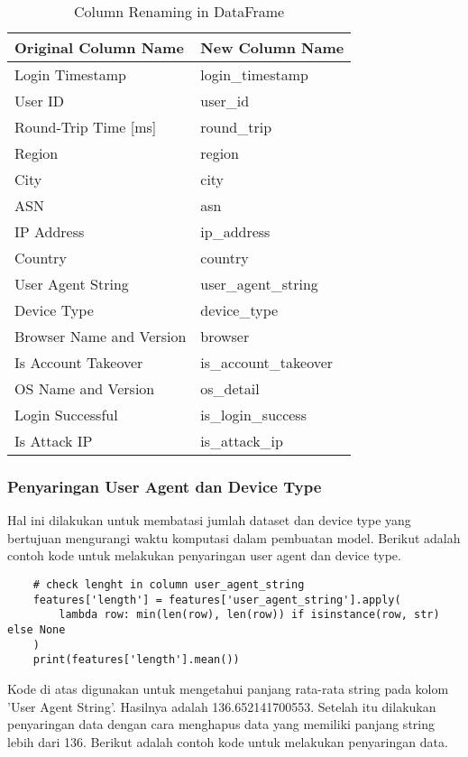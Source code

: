     \begin{table}[H]
        \centering
        \begin{tabular}{|l|l|}
        \hline
        \textbf{Original Column Name} & \textbf{New Column Name} \\ \hline
        Login Timestamp & login\_timestamp \\ 
        User ID & user\_id \\ 
        Round-Trip Time [ms] & round\_trip \\ 
        Region & region \\ 
        City & city \\ 
        ASN & asn \\ 
        IP Address & ip\_address \\ 
        Country & country \\ 
        User Agent String & user\_agent\_string \\ 
        Device Type & device\_type \\ 
        Browser Name and Version & browser \\ 
        Is Account Takeover & is\_account\_takeover \\ 
        OS Name and Version & os\_detail \\ 
        Login Successful & is\_login\_success \\ 
        Is Attack IP & is\_attack\_ip \\ \hline
        \end{tabular}
        \caption{Column Renaming in DataFrame}
        \label{tab:column_renaming}
        \end{table}

\subsubsection{Penyaringan User Agent dan Device Type}
Hal ini dilakukan untuk membatasi jumlah dataset dan device type yang bertujuan mengurangi waktu komputasi dalam pembuatan model. Berikut adalah contoh kode untuk melakukan penyaringan user agent dan device type. 

\begin{lstlisting}
    # check lenght in column user_agent_string
    features['length'] = features['user_agent_string'].apply(
        lambda row: min(len(row), len(row)) if isinstance(row, str) else None
    )
    print(features['length'].mean())
    \end{lstlisting}

    Kode di atas digunakan untuk mengetahui panjang rata-rata string pada kolom 'User Agent String'. Hasilnya adalah 136.652141700553. 
    Setelah itu dilakukan penyaringan data dengan cara menghapus data yang memiliki panjang string lebih dari 136. Berikut adalah contoh kode untuk melakukan penyaringan data.

